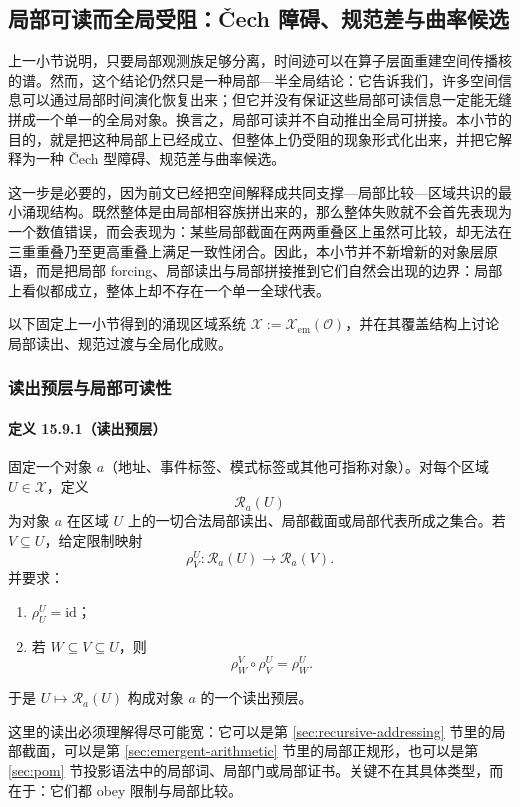 \subsection{局部可读而全局受阻：Čech 障碍、规范差与曲率候选}\label{subsec:physical-spacetime-skeleton-local-global-obstruction}

上一小节说明，只要局部观测族足够分离，时间迹可以在算子层面重建空间传播核的谱。然而，这个结论仍然只是一种局部—半全局结论：它告诉我们，许多空间信息可以通过局部时间演化恢复出来；但它并没有保证这些局部可读信息一定能无缝拼成一个单一的全局对象。换言之，局部可读并不自动推出全局可拼接。本小节的目的，就是把这种局部上已经成立、但整体上仍受阻的现象形式化出来，并把它解释为一种 Čech 型障碍、规范差与曲率候选。

这一步是必要的，因为前文已经把空间解释成共同支撑—局部比较—区域共识的最小涌现结构。既然整体是由局部相容族拼出来的，那么整体失败就不会首先表现为一个数值错误，而会表现为：某些局部截面在两两重叠区上虽然可比较，却无法在三重重叠乃至更高重叠上满足一致性闭合。因此，本小节并不新增新的对象层原语，而是把局部 forcing、局部读出与局部拼接推到它们自然会出现的边界：局部上看似都成立，整体上却不存在一个单一全球代表。

以下固定上一小节得到的涌现区域系统 \(\mathcal X:=\mathcal X_{\mathrm{em}}(\mathcal O)\)，并在其覆盖结构上讨论局部读出、规范过渡与全局化成败。

\subsubsection{读出预层与局部可读性}

\paragraph{定义 15.9.1（读出预层）}
固定一个对象 \(a\)（地址、事件标签、模式标签或其他可指称对象）。对每个区域 \(U\in\mathcal X\)，定义
\[
\mathscr R_a(U)
\]
为对象 \(a\) 在区域 \(U\) 上的一切合法局部读出、局部截面或局部代表所成之集合。若 \(V\subseteq U\)，给定限制映射
\[
\rho^U_V:\mathscr R_a(U)\to \mathscr R_a(V).
\]
并要求：
\begin{enumerate}
  \item \(\rho^U_U=\mathrm{id}\)；
  \item 若 \(W\subseteq V\subseteq U\)，则
  \[
  \rho^V_W\circ \rho^U_V=\rho^U_W.
  \]
\end{enumerate}
于是 \(U\mapsto \mathscr R_a(U)\) 构成对象 \(a\) 的一个读出预层。

这里的读出必须理解得尽可能宽：它可以是第 \ref{sec:recursive-addressing} 节里的局部截面，可以是第 \ref{sec:emergent-arithmetic} 节里的局部正规形，也可以是第 \ref{sec:pom} 节投影语法中的局部词、局部门或局部证书。关键不在其具体类型，而在于：它们都 obey 限制与局部比较。

